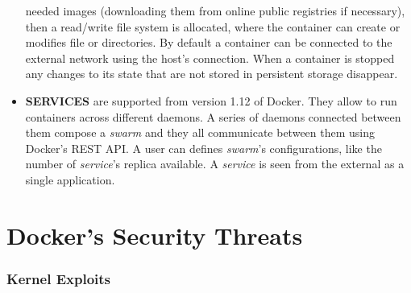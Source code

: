 \documentclass[a4paper,12pt]{article}
\begin{document}
\begin{itemize}
  needed images (downloading them from online public registries if necessary),
  then a read/write file system is allocated, where the container can create or
  modifies file or directories.  By default a container can be connected to the
  external network using the host's connection. When a container is stopped  any
  changes to its state that are not stored in persistent storage disappear.
  \item \textbf{SERVICES} are supported from version 1.12 of Docker. They allow
  to run containers across different daemons. A series of daemons connected
  between them compose a \textit{swarm} and they all communicate between them
  using Docker's REST API. A user can defines \textit{swarm}'s configurations,
  like the number of \textit{service}'s replica available. A \textit{service} is
  seen from the external as a single application. \cite{docker_objects}
\end{itemize}

\newpage

\section{Docker's Security Threats}

\cite{mitigating_docker_security_issues_yasrab}

\cite{sysdig_docker_vulnerabilities}

\subsubsection{Kernel Exploits}
\end{document}
